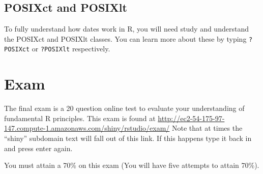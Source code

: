 \documentclass[]{book}
\begin{document}
\section{POSIXct and POSIXlt}\label{posixct-and-posixlt}

To fully understand how dates work in R, you will need study and
understand the POSIXct and POSIXlt classes. You can learn more about
these by typing \texttt{?POSIXct} or \texttt{?POSIXlt} respectively.

\chapter{Exam}\label{exam}

The final exam is a 20 question online test to evaluate your
understanding of fundamental R principles. This exam is found at
\url{http://ec2-54-175-97-147.compute-1.amazonaws.com/shiny/rstudio/exam/}
Note that at times the ``shiny'' subdomain text will fall out of this
link. If this happens type it back in and press enter again.

You must attain a 70\% on this exam (You will have five attempts to
attain 70\%).


\end{document}
